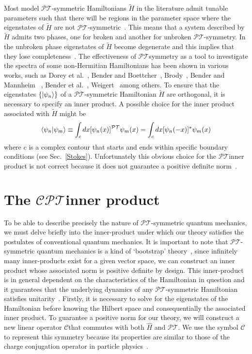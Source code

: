\documentclass[12pt, a4paper]{report}
\newcommand\PT{\(\mathcal{PT}\)}
\newcommand\CC{\(\mathcal{C}\)}
\begin{document}
Most model \PT-symmetric Hamiltonians $\tilde{H}$ in the literature admit tunable parameters such that there will be regions in the parameter space where the eigenstates of $\tilde{H}$ are not \PT-symmetric~\cite{Brody_2013}. This means that a system described by $\tilde{H}$ admits two phases, one for broken and another for unbroken \PT-symmetry. In the unbroken phase eigenstates of $\tilde{H}$ become degenerate and this implies that they lose completeness~\cite{Brody_2013}.
The effectiveness of \PT\:symmetry as a tool to investigate the spectra of some non-Hermitian Hamiltonians has been shown in various works, such as Dorey et al.~\cite{Dorey_2001, Dorey_2004}, Bender and Boettcher~\cite{RealSpectrainNHH}, Brody~\cite{Brody_2016}, Bender and Mannheim ~\cite{Bender_2010}, Bender et al.~\cite{PTsymmetricQM}, Weigert~\cite{Weigert_2003} among others.
To ensure that the eigenstates $\{\ket{\psi_n}\}$ of a \PT-symmetric Hamiltonian $\tilde{H}$ are orthogonal, it is necessary to specify an inner product. A possible choice for the inner product associated with $\tilde{H}$ might be~\cite{PTsymmetricQM}
\begin{equation}\label{eq:2.3}
\braket{\psi_n|\psi_m} \equiv \int_{c} dx [\psi_{n}(x)]^{\mathcal{PT}}\psi_m(x) = \int_{c} dx [\psi_{n}(-x)]^{*}\psi_m(x)
\end{equation}
where $c$ is a complex contour that starts and ends within specific boundary conditions (see Sec.~\ref{Stokes}). Unfortunately this obvious choice for the \PT\:inner product is not correct because it does not guarantee a positive definite norm~\cite{MakingSense}.

\section{The \texorpdfstring{$\mathcal{CPT}$}\:\:inner product}\label{CPT}
To be able to describe precisely the nature of \PT-symmetric quantum mechanics, we must delve briefly into the inner-product under which our theory satisfies the postulates of conventional quantum mechanics. It is important to note that \PT-symmetric quantum mechanics is a kind of `bootstrap' theory~\cite{MakingSense}, since infinitely many inner-products exist for a given vector space, we can construct an inner product whose associated norm is positive definite by design. This inner-product is in general dependent on the characteristics of the Hamiltonian in question and it guarantees that the underlying dynamics of any \PT-symmetric Hamiltonian satisfies unitarity~\cite{MustaHbeHermitian}.
Firstly, it is necessary to solve for the eigenstates of the Hamiltonian before knowing the Hilbert space and consequentially the associated inner product.
To guarantee a positive norm for our theory, we will construct a new linear operator \CC\:that commutes with both $\hat{H}$ and \PT. We use the symbol \CC\: to represent this symmetry because its properties are similar to those of the charge conjugation operator in particle physics~\cite{MakingSense}.
\end{document}

